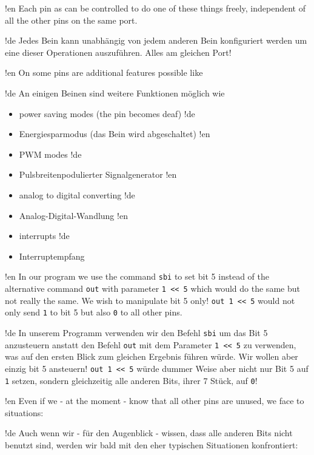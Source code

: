 !en Each pin as can be controlled to do one of these things freely, independent of all the other pins on the same port.

!de Jedes Bein kann unabhängig von jedem anderen Bein konfiguriert werden um eine dieser Operationen auszuführen. Alles am gleichen Port!



!en On some pins are additional features possible like

!de An einigen Beinen sind weitere Funktionen möglich wie

\begin{itemize}
!en   \item power saving modes (the pin becomes deaf)
!de   \item Energiesparmodus (das Bein wird abgeschaltet)
!en   \item PWM modes
!de   \item Pulsbreitenpodulierter Signalgenerator
!en   \item analog to digital converting
!de   \item Analog-Digital-Wandlung
!en   \item interrupts
!de   \item Interruptempfang
\end{itemize}

!en In our program we use the command \texttt{sbi} to set bit 5 instead of the alternative command \texttt{out} with parameter \texttt{1 << 5} which would do the same but not really the same. We wish to manipulate bit 5 only! \texttt{out 1 << 5} would not only send \texttt{1} to bit 5 but also \texttt{0} to all other pins.

!de In unserem Programm verwenden wir den Befehl \texttt{sbi} um das Bit 5 anzusteuern anstatt den Befehl \texttt{out} mit dem Parameter \texttt{1 << 5} zu verwenden, was auf den ersten Blick zum gleichen Ergebnis führen würde. Wir wollen aber einzig bit 5 ansteuern! \texttt{out 1 << 5} würde dummer Weise aber nicht nur Bit 5 auf \texttt{1} setzen, sondern gleichzeitig alle anderen Bits, ihrer 7 Stück, auf \texttt{0}!


!en Even if we - at the moment - know that all other pins are unused, we face to situations:

!de Auch wenn wir - für den Augenblick - wissen, dass alle anderen Bits nicht benutzt sind, werden wir bald mit den eher typischen Situationen konfrontiert:

